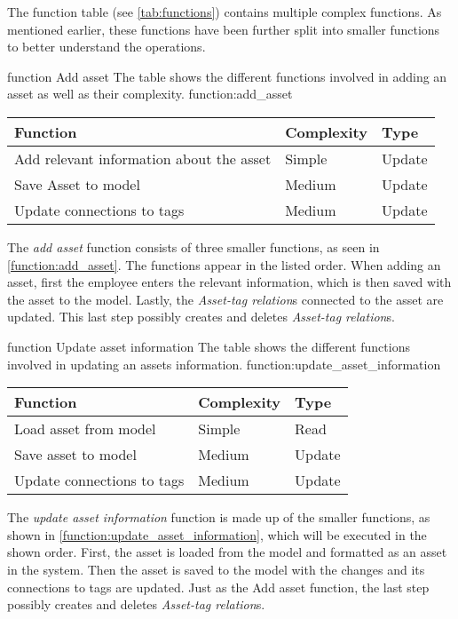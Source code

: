 The function table (see \autoref{tab:functions}) contains multiple complex functions. As mentioned earlier, these functions have been further split into smaller functions to better understand the operations. 


\fancyLayout
    {function}
    {Add asset}
    {The table shows the different functions involved in adding an asset as well as their complexity.}
    {function:add_asset}
    {
        \centering
        \begin{tabular}{|l|l|l|}
            \hline
            \textbf{Function} & \textbf{Complexity} & \textbf{Type}\\
            \hline
            \hline
            Add relevant information about the asset & Simple & Update \\
            \hline
            Save Asset to model & Medium & Update \\
            \hline
            Update connections to tags & Medium & Update\\
            \hline
        \end{tabular}
}

The \textit{add asset} function consists of three smaller functions, as seen in \autoref{function:add_asset}. The functions appear in the listed order. When adding an asset, first the employee enters the relevant information, which is then saved with the asset to the model. Lastly, the \textit{Asset-tag relation}s connected to the asset are updated. This last step possibly creates and deletes \textit{Asset-tag relation}s.

\fancyLayout
    {function}
    {Update asset information}
    {The table shows the different functions involved in updating an assets information.}
    {function:update_asset_information}
    {
        \centering
        \begin{tabular}{|l|l|l|}
            \hline
            \textbf{Function} & \textbf{Complexity} & \textbf{Type}\\
            \hline
            \hline
            Load asset from model & Simple & Read \\
            \hline
            Save asset to model & Medium & Update \\
            \hline
            Update connections to tags & Medium & Update\\
            \hline
        \end{tabular}
}

The \textit{update asset information} function is made up of the smaller functions, as shown in \autoref{function:update_asset_information}, which will be executed in the shown order. First, the asset is loaded from the model and formatted as an asset in the system. Then the asset is saved to the model with the changes and its connections to tags are updated. Just as the Add asset function, the last step possibly creates and deletes \textit{Asset-tag relation}s.

